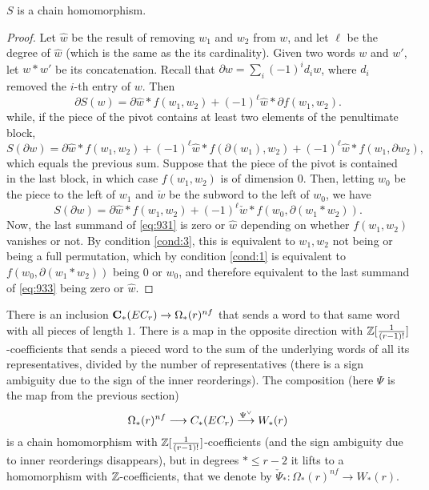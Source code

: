 \begin{lemma}
	$S$ is a chain homomorphism.
\end{lemma}

\begin{proof}
	Let $\hat{w}$ be the result of removing $w_1$ and $w_2$ from $w$, and let $\ell$ be the degree of $\hat{w}$ (which is the same as the its cardinality). Given two words $w$ and $w'$, let $w*w'$ be its concatenation. Recall that $\partial w = \sum_{i} (-1)^{i}d_iw$, where $d_i$ removed the $i$-th entry of $w$. Then
	\begin{equation}\label{eq:931}
		\partial S(w) = \partial \hat{w}*f(w_1,w_2) + (-1)^{\ell}\hat{w}*\partial f(w_1,w_2).
	\end{equation}
	while, if the piece of the pivot contains at least two elements of the penultimate block,
	\[S(\partial w) = \partial \hat{w}*f(w_1,w_2) + (-1)^{\ell}\hat{w}*f(\partial(w_1),w_2) + (-1)^{\ell}\hat{w}*f(w_1,\partial w_2),\]
	which equals the previous sum. Suppose that the piece of the pivot is contained in the last block, in which case $f(w_1,w_2)$ is of dimension $0$. Then, letting $w_0$ be the piece to the left of $w_1$ and $\check{w}$ be the subword to the left of $w_0$, we have
	\begin{equation}\label{eq:933}
		S(\partial w) = \partial \hat{w}*f(w_1,w_2) + (-1)^\ell \check{w}*f(w_0,\partial(w_1*w_2)).
	\end{equation}
	Now, the last summand of \eqref{eq:931} is zero or $\hat{w}$ depending on whether $f(w_1,w_2)$ vanishes or not. By condition \eqref{cond:3}, this is equivalent to $w_1,w_2$ not being or being a full permutation, which by condition \eqref{cond:1} is equivalent to $f(w_0,\partial(w_1*w_2))$ being $0$ or $w_0$, and therefore equivalent to the last summand of \eqref{eq:933} being zero or $\hat{w}$.
\end{proof}

There is an inclusion $\mathbf{C}_*(EC_r)\to \Omega_*(r)^{nf}$ that sends a word to that same word with all pieces of length $1$. There is a map in the opposite direction with $\mathbb{Z}[\frac{1}{(r-1)!}]$-coefficients that sends a pieced word to the sum of the underlying words of all its representatives, divided by the number of representatives (there is a sign ambiguity due to the sign of the inner reorderings). The composition (here $\Psi$ is the map from the previous section)
\begin{equation} \label{eq:234}
	\Omega_*(r)^{nf}\longrightarrow C_*(EC_r)\overset{\Psi^\vee}{\longrightarrow} W_*(r)
\end{equation}
is a chain homomorphism with $\mathbb{Z}[\frac{1}{(r-1)!}]$-coefficients (and the sign ambiguity due to inner reorderings disappears), but in degrees $*\leq r-2$ it lifts to a homomorphism with $\mathbb{Z}$-coefficients, that we denote by $\check{\Psi}_*\colon \Omega_*(r)^{nf}\to W_*(r)$.


